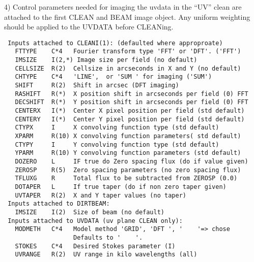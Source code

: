 4) Control parameters needed for imaging the uvdata in the ``UV''
 clean are attached to the first CLEAN and BEAM image object.  Any
 uniform weighting should be applied to the UVDATA before CLEANing.
{\small\begin{verbatim}
 Inputs attached to CLEANI(1): (defaulted where approproate)
   FTTYPE    C*4   Fourier transform type 'FFT' or 'DFT'. ('FFT')
   IMSIZE    I(2,*) Image size per field (no default)
   CELLSIZE  R(2)  Cellsize in arcseconds in X and Y (no default)
   CHTYPE    C*4   'LINE',  or 'SUM ' for imaging ('SUM')
   SHIFT     R(2)  Shift in arcsec (DFT imaging)
   RASHIFT   R(*)  X position shift in arcseconds per field (0) FFT
   DECSHIFT  R(*)  Y position shift in arcseconds per field (0) FFT
   CENTERX   I(*)  Center X pixel position per field (std default)
   CENTERY   I(*)  Center Y pixel position per field (std default)
   CTYPX     I     X convolving function type (std default)
   XPARM     R(10) X convolving function parameters( std default)
   CTYPY     I     Y convolving function type (std default)
   YPARM     R(10) Y convolving function parameters (std default)
   DOZERO    L     IF true do Zero spacing flux (do if value given)
   ZEROSP    R(5)  Zero spacing parameters (no zero spacing flux)
   TFLUXG    R     Total flux to be subtracted from ZEROSP (0.0)
   DOTAPER   L     If true taper (do if non zero taper given)
   UVTAPER   R(2)  X and Y taper values (no taper)
 Inputs attached to DIRTBEAM:
   IMSIZE    I(2)  Size of beam (no default)
 Inputs attached to UVDATA (uv plane CLEAN only):
   MODMETH   C*4   Model method 'GRID', 'DFT ', '    '=> chose
                   Defaults to '    '.
   STOKES    C*4   Desired Stokes parameter (I)
   UVRANGE   R(2)  UV range in kilo wavelengths (all)
\end{verbatim}}

